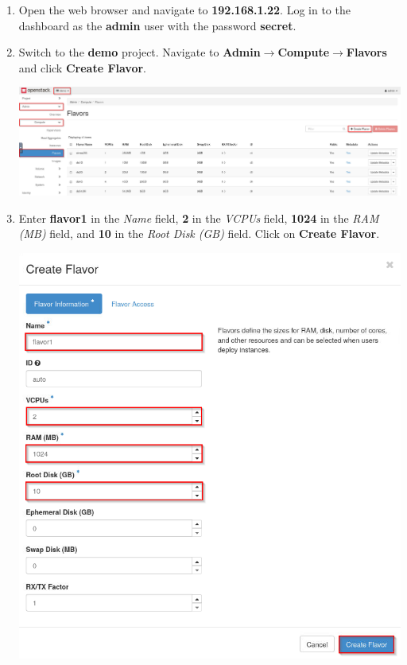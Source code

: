 \documentclass[letterpaper, 12pt]{article}
\begin{document}
\begin{enumerate}
    \item Open the web browser and navigate to \textbf{192.168.1.22}. Log in to the dashboard as the \textbf{admin} user
    with the password \textbf{secret}.
    
    \item Switch to the \textbf{demo} project. Navigate to \textbf{Admin$\rightarrow$Compute$\rightarrow$Flavors} and
    click \textbf{Create Flavor}.

    \begin{center}
        \includegraphics[width=\linewidth]{images/part2/step2.png}
    \end{center}

    \item Enter \textbf{flavor1} in the \textit{Name} field, \textbf{2} in the \textit{VCPUs} field, \textbf{1024} in
    the \textit{RAM (MB)} field, and \textbf{10} in the \textit{Root Disk (GB)} field. Click on \textbf{Create Flavor}.

    \begin{center}
        \includegraphics[width=\linewidth]{images/part2/step3.png}
    \end{center}


\end{enumerate}
\end{document}
